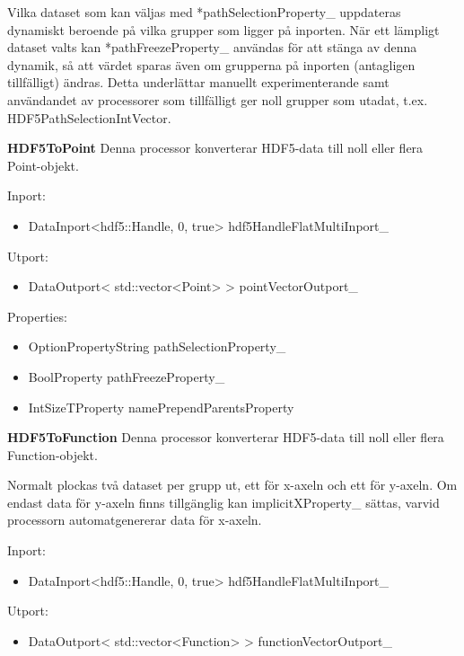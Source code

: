 Vilka dataset som kan väljas med *pathSelectionProperty\_ uppdateras dynamiskt beroende på vilka grupper som ligger på inporten. När ett lämpligt dataset valts kan *pathFreezeProperty\_ användas för att stänga av denna dynamik, så att värdet sparas även om grupperna på inporten (antagligen tillfälligt) ändras. Detta underlättar manuellt experimenterande samt användandet av processorer som tillfälligt ger noll grupper som utadat, t.ex. HDF5PathSelectionIntVector.

\textbf{HDF5ToPoint} \newline
Denna processor konverterar HDF5-data till noll eller flera Point-objekt.

Inport:
\begin{itemize}
\item DataInport<hdf5::Handle, 0, true> hdf5HandleFlatMultiInport\_
\end{itemize}

Utport:
\begin{itemize}
\item DataOutport< std::vector<Point> > pointVectorOutport\_
\end{itemize}

Properties:
\begin{itemize}
    \setlength\itemsep{0em}
    \item OptionPropertyString pathSelectionProperty\_
    \item BoolProperty pathFreezeProperty\_
    \item IntSizeTProperty namePrependParentsProperty
\end{itemize}

\textbf{HDF5ToFunction}\newline
Denna processor konverterar HDF5-data till noll eller flera Function-objekt. 

Normalt plockas två dataset per grupp ut, ett för x-axeln och ett för y-axeln. Om endast data för y-axeln finns tillgänglig kan implicitXProperty\_ sättas, varvid processorn automatgenererar data för x-axeln.

Inport:
\begin{itemize}
\item DataInport<hdf5::Handle, 0, true> hdf5HandleFlatMultiInport\_
\end{itemize}

\newpage

Utport:
\begin{itemize}
\item DataOutport< std::vector<Function> > functionVectorOutport\_
\end{itemize}

